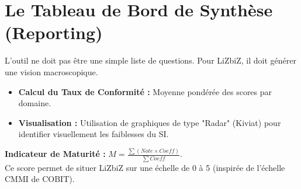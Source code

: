 \section{Le Tableau de Bord de Synthèse (Reporting)}

L'outil ne doit pas être une simple liste de questions. Pour LiZbiZ, il doit générer une vision macroscopique.

\begin{itemize}
    \item \textbf{Calcul du Taux de Conformité :} Moyenne pondérée des scores par domaine.
    \item \textbf{Visualisation :} Utilisation de graphiques de type "Radar" (Kiviat) pour identifier visuellement les faiblesses du SI.
\end{itemize}

\begin{boxdef}
\textbf{Indicateur de Maturité :} 
$M = \frac{\sum (Note \times Coeff)}{\sum Coeff}$. \\
Ce score permet de situer LiZbiZ sur une échelle de 0 à 5 (inspirée de l'échelle CMMI de COBIT).
\end{boxdef}
